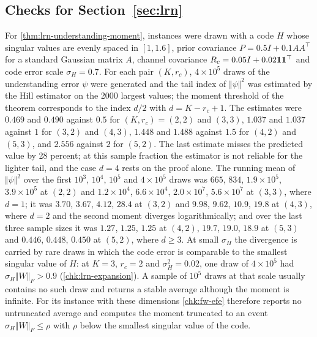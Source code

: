 \subsection{Checks for \texorpdfstring{Section~\ref{sec:lrn}}{learned interfaces}}\label{chk:lrn}

\begin{numcheck}\label{chk:lrn-understanding}
For \cref{thm:lrn-understanding-moment}, instances were drawn with a code $H$ whose singular values are evenly spaced in $[1,1.6]$, prior covariance $P=0.5I+0.1AA^\top$ for a standard Gaussian matrix $A$, channel covariance $R_c=0.05I+0.02\mathbf{1}\mathbf{1}^\top$ and code error scale $\sigma_H=0.7$. For each pair $(K,r_c)$, $4\times10^5$ draws of the understanding error $\psi$ were generated and the tail index of $\Vert\psi\Vert^2$ was estimated by the Hill estimator on the 2000 largest values; the moment threshold of the theorem corresponds to the index $d/2$ with $d=K-r_c+1$. The estimates were $0.469$ and $0.490$ against $0.5$ for $(K,r_c)=(2,2)$ and $(3,3)$, $1.037$ and $1.037$ against $1$ for $(3,2)$ and $(4,3)$, $1.448$ and $1.488$ against $1.5$ for $(4,2)$ and $(5,3)$, and $2.556$ against $2$ for $(5,2)$. The last estimate misses the predicted value by 28 percent; at this sample fraction the estimator is not reliable for the lighter tail, and the case $d=4$ rests on the proof alone. The running mean of $\Vert\psi\Vert^2$ over the first $10^3$, $10^4$, $10^5$ and $4\times10^5$ draws was $665$, $834$, $1.9\times10^5$, $3.9\times10^5$ at $(2,2)$ and $1.2\times10^4$, $6.6\times10^4$, $2.0\times10^7$, $5.6\times10^7$ at $(3,3)$, where $d=1$; it was $3.70$, $3.67$, $4.12$, $28.4$ at $(3,2)$ and $9.98$, $9.62$, $10.9$, $19.8$ at $(4,3)$, where $d=2$ and the second moment diverges logarithmically; and over the last three sample sizes it was $1.27$, $1.25$, $1.25$ at $(4,2)$, $19.7$, $19.0$, $18.9$ at $(5,3)$ and $0.446$, $0.448$, $0.450$ at $(5,2)$, where $d\ge3$. At small $\sigma_H$ the divergence is carried by rare draws in which the code error is comparable to the smallest singular value of $H$: at $K=3$, $r_c=2$ and $\sigma_H^2=0.02$, one draw of $4\times10^5$ had $\sigma_H\Vert W\Vert_F>0.9$ (\cref{chk:lrn-expansion}). A sample of $10^5$ draws at that scale usually contains no such draw and returns a stable average although the moment is infinite. For its instance with these dimensions \cref{chk:fw-efe} therefore reports no untruncated average and computes the moment truncated to an event $\sigma_H\Vert W\Vert_F\le\rho$ with $\rho$ below the smallest singular value of the code.
\end{numcheck}

